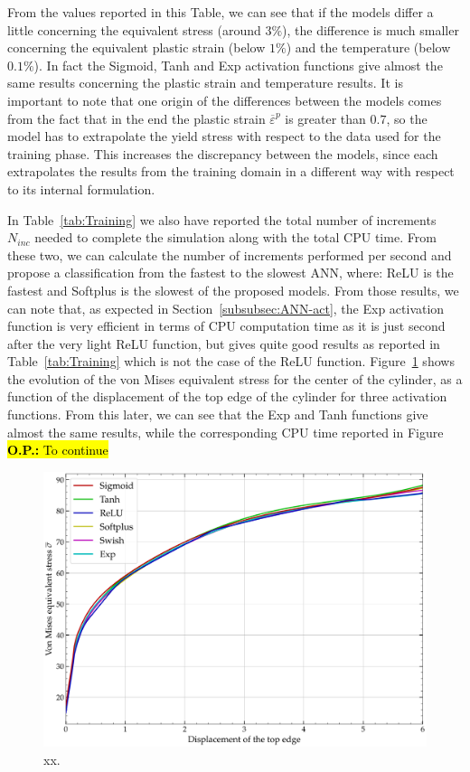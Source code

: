 \documentclass[algorithms,article,submit,pdftex,oneauthors]{Definitions/mdpi}
\DeclareRobustCommand{\OP}[1]{\begingroup\sethlcolor{VWyellow}\textcolor{red}{\hl{\textbf{O.P.:} #1}}\endgroup}
\begin{document}
From the values reported in this Table, we can see that if the models differ a little concerning the equivalent stress (around $3\%$), the difference is much smaller concerning the equivalent plastic strain (below $1\%$) and the temperature (below $0.1\%$). In fact the Sigmoid, Tanh and Exp activation functions give almost the same results concerning the plastic strain and temperature results.
It is important to note that one origin of the differences between the models comes from the fact that in the end the plastic strain $\overline{\varepsilon}^p$ is greater than $0.7$, so the model has to extrapolate the yield stress with respect to the data used for the training phase. This increases the discrepancy between the models, since each extrapolates the results from the training domain in a different way with respect to its internal formulation.

In Table~\ref{tab:Training} we also have reported the total number of increments $N_{inc}$ needed to complete the simulation along with the total CPU time.
From these two, we can calculate the number of increments performed per second and propose a classification from the fastest to the slowest ANN, where: ReLU is the fastest and Softplus is the slowest of the proposed models.
From those results, we can note that, as expected in Section~\ref{subsubsec:ANN-act}, the Exp activation function is very efficient in terms of CPU computation time as it is just second after the very light ReLU function, but gives quite good results as reported in Table~\ref{tab:Training} which is not the case of the ReLU function.
Figure~\ref{fig:Num-misesTH} shows the evolution of the von Mises equivalent stress for the center of the cylinder, as a function of the displacement of the top edge of the cylinder for three activation functions. From this later, we can see that the Exp and Tanh functions give almost the same results, while the corresponding CPU time reported in Figure 
\OP{To continue}


\begin{figure}[h]
\centering
\includegraphics[width=0.8\columnwidth]{Figures/vonMises}
\caption{xx.}
\label{fig:Num-misesTH}
\end{figure}
\end{document}
